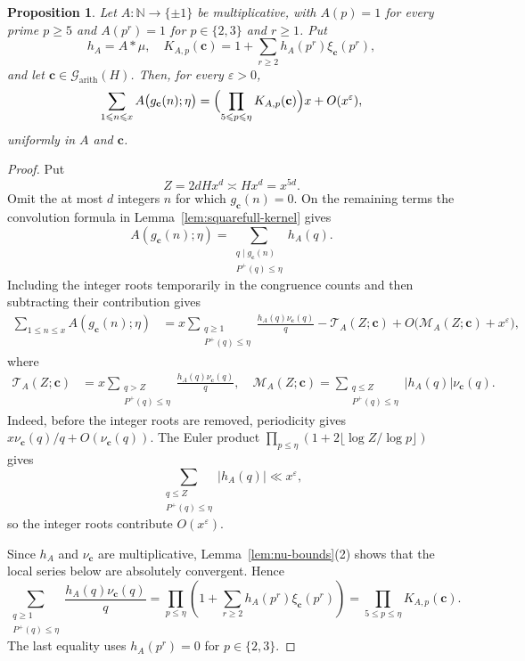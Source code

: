 \documentclass[12pt,reqno]{amsart}
\numberwithin{equation}{section}
\newtheorem{proposition}[theorem]{Proposition}
\theoremstyle{definition}
\renewcommand{\le}{\leqslant}
\renewcommand{\ge}{\geqslant}
\newcommand{\NN}{\mathbb{N}}
\newcommand{\cc}{\mathbf{c}}
\begin{document}
\begin{proposition}\label{prop:squarefull-polynomial-values}
Let $A:\NN\to\{\pm1\}$ be multiplicative, with $A(p)=1$ for every prime $p\ge5$ and $A(p^r)=1$ for $p\in\{2,3\}$ and $r\ge1$.
Put
\begin{equation}\label{eq:def-KAp}
h_A=A*\mu,\quad
K_{A,p}(\cc)=1+\sum_{r\ge2}h_A(p^r)\xi_\cc(p^r),
\end{equation}
and let $\cc\in\mathcal G_{\mathrm{arith}}(H)$.
Then, for every $\varepsilon>0$,
\[
\sum_{1\le n\le x}A\bigl(g_\cc(n);\eta\bigr)
=\Bigl(\prod_{5\le p\le\eta}K_{A,p}(\cc)\Bigr)x
+O(x^\varepsilon),
\]
uniformly in $A$ and $\cc$.
\end{proposition}

\begin{proof}
Put
\begin{equation}\label{eq:height-cutoff}
Z=2dHx^d\asymp Hx^d=x^{5d}.
\end{equation}
Omit the at most $d$ integers $n$ for which $g_\cc(n)=0$.
On the remaining terms the convolution formula in Lemma~\ref{lem:squarefull-kernel} gives
\[
A(g_\cc(n);\eta)
=\sum_{\substack{q\mid g_\cc(n)\\P^+(q)\le\eta}}h_A(q).
\]
Including the integer roots temporarily in the congruence counts and then subtracting their contribution gives
\begin{align}\label{eq:trunc-main-err}
\sum_{1\le n\le x}A(g_\cc(n);\eta)
&=x\sum_{\substack{q\ge1\\P^+(q)\le\eta}}
\frac{h_A(q)\nu_\cc(q)}q-\mathcal T_A(Z;\cc)
+O\bigl(\mathcal M_A(Z;\cc)+x^\varepsilon\bigr),
\end{align}
where
\begin{equation}\label{eq:def-trunc-errors}
\begin{aligned}
\mathcal T_A(Z;\cc)
&=x\sum_{\substack{q>Z\\P^+(q)\le\eta}}
\frac{h_A(q)\nu_\cc(q)}q,\quad
\mathcal M_A(Z;\cc)=
\sum_{\substack{q\le Z\\P^+(q)\le\eta}}
|h_A(q)|\nu_\cc(q).
\end{aligned}
\end{equation}
Indeed, before the integer roots are removed, periodicity gives $x\nu_\cc(q)/q+O(\nu_\cc(q))$.
The Euler product $\prod_{p\le\eta}(1+2\lfloor\log Z/\log p\rfloor)$ gives
\[
\sum_{\substack{q\le Z\\P^+(q)\le\eta}}|h_A(q)|
\ll x^\varepsilon,
\]
so the integer roots contribute $O(x^\varepsilon)$.

Since $h_A$ and $\nu_\cc$ are multiplicative, Lemma~\ref{lem:nu-bounds}(2) shows that the local series below are absolutely convergent.
Hence
\begin{equation}\label{eq:trunc-euler-prod}
\sum_{\substack{q\ge1\\P^+(q)\le\eta}}
\frac{h_A(q)\nu_\cc(q)}q
=\prod_{p\le\eta}
\left(1+\sum_{r\ge2}h_A(p^r)\xi_\cc(p^r)\right)
=\prod_{5\le p\le\eta}K_{A,p}(\cc).
\end{equation}
The last equality uses $h_A(p^r)=0$ for $p\in\{2,3\}$.


\end{proof}
\end{document}

